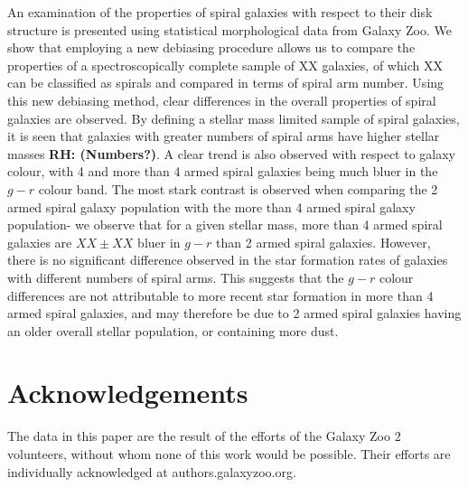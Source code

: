 \documentclass[useAMS,usenatbib]{mn2e}
\newcommand{\rh}[1]{{\bf \textcolor{RoyalPurple}{RH: #1}}}
\begin{document}
An examination of the properties of spiral galaxies with respect to their disk structure is presented using statistical morphological data from Galaxy Zoo. We show that employing a new debiasing procedure allows us to compare the properties of a spectroscopically complete sample of XX galaxies, of which XX can be classified as spirals and compared in terms of spiral arm number. Using this new debiasing method, clear differences in the overall properties of spiral galaxies are observed. By defining a stellar mass limited sample of spiral galaxies, it is seen that galaxies with greater numbers of spiral arms have higher stellar masses \rh{(Numbers?)}. A clear trend is also observed with respect to galaxy colour, with 4 and more than 4 armed spiral galaxies being much bluer in the $g-r$ colour band. The most stark contrast is observed when comparing the 2 armed spiral galaxy population with the more than 4 armed spiral galaxy population- we observe that for a given stellar mass, more than 4 armed spiral galaxies are $XX \pm XX$ bluer in $g-r$ than 2 armed spiral galaxies. However, there is no significant difference observed in the star formation rates of galaxies with different numbers of spiral arms. This suggests  that the $g-r$ colour differences are not attributable to more recent star formation in more than 4 armed spiral galaxies, and may therefore be due to 2 armed spiral galaxies having an older overall stellar population, or containing more dust.


\section{Acknowledgements}

The data in this paper are the result of the efforts of the Galaxy Zoo 2 volunteers, without whom none of this work would be possible. Their efforts are individually acknowledged at authors.galaxyzoo.org.




\end{document}
